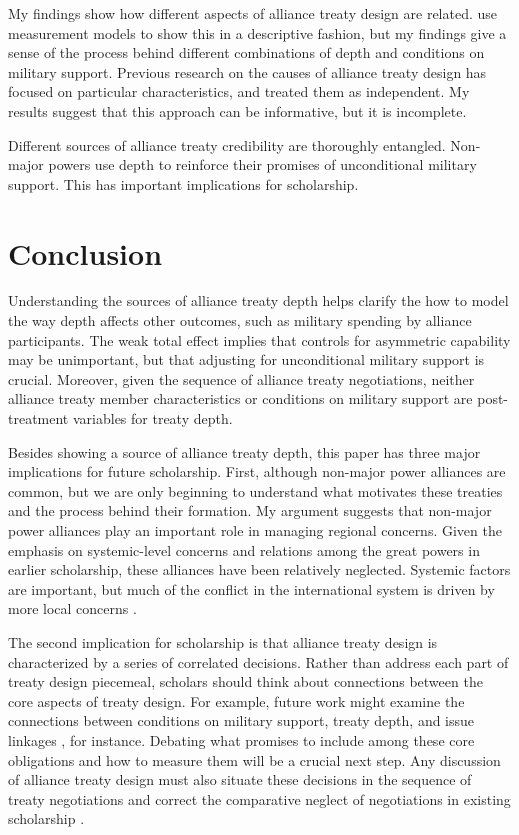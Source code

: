 \documentclass[12pt]{article}
\begin{document}
My findings show how different aspects of alliance treaty design are related. 
\citet{BensonClinton2016} use measurement models to show this in a descriptive fashion, but my findings give a sense of the process behind different combinations of depth and conditions on military support. 
Previous research on the causes of alliance treaty design \citep{Benson2012, Mattes2012, Chibaetal2015} has focused on particular characteristics, and treated them as independent. 
My results suggest that this approach can be informative, but it is incomplete. 


Different sources of alliance treaty credibility are thoroughly entangled. 
Non-major powers use depth to reinforce their promises of unconditional military support. 
This has important implications for scholarship. 


\section{Conclusion}


Understanding the sources of alliance treaty depth helps clarify the how to model the way depth affects other outcomes, such as military spending by alliance participants. 
The weak total effect implies that controls for asymmetric capability may be unimportant, but that adjusting for unconditional military support is crucial. 
Moreover, given the sequence of alliance treaty negotiations, neither alliance treaty member characteristics or conditions on military support are post-treatment variables for treaty depth. 


Besides showing a source of alliance treaty depth, this paper has three major implications for future scholarship. 
First, although non-major power alliances are common, but we are only beginning to understand what motivates these treaties 
and the process behind their formation. 
My argument suggests that non-major power alliances play an important role in managing regional concerns. 
Given the emphasis on systemic-level concerns and relations among the great powers in earlier scholarship, these alliances have been relatively neglected. 
Systemic factors are important, but much of the conflict in the international system is driven by more local concerns \citep{Renshon2017}. 


The second implication for scholarship is that alliance treaty design is characterized by a series of correlated decisions. 
Rather than address each part of treaty design piecemeal, scholars should think about connections between the core aspects of treaty design. 
For example, future work might examine the connections between conditions on military support, treaty depth, and issue linkages \citep{Poast2012, Poast2013}, for instance.  
Debating what promises to include among these core obligations and how to measure them will be a crucial next step. 
Any discussion of alliance treaty design must also situate these decisions in the sequence of treaty negotiations and correct the comparative neglect of negotiations in existing scholarship \citep{Poast2019a}. 
\end{document}

